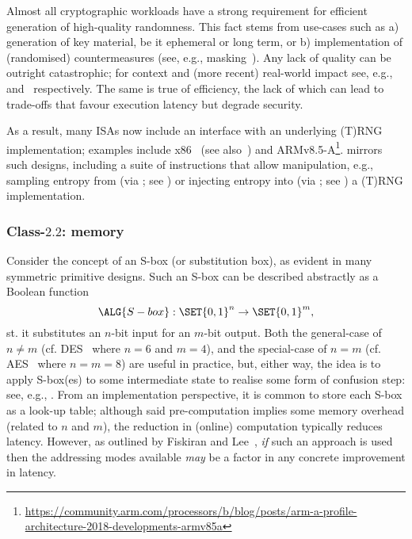 Almost all cryptographic workloads have a strong requirement for efficient
generation of high-quality randomness.  This fact stems from use-cases such
as
a) generation of key material, be it ephemeral or long term,
   or
b) implementation of (randomised) countermeasures
   (see, e.g., masking~\cite[Chapter 9]{SCARV:ManOswPop:07}).
Any lack of quality can be outright catastrophic;
for context and (more recent) real-world impact see, e.g.,~\cite{SCARV:KSWH:98,SCARV:RFC:4086} and~\cite{SCARV:NSSKM:17} respectively.
The same is true of efficiency, the lack of which can lead to trade-offs 
that favour execution latency but degrade security.

As a result, many ISAs now include an interface with an underlying (T)RNG
implementation; examples include
x86~\cite[Section 7.3.17.1 and 7.3.17.2]{SCARV:X86:2:18} (see also~\cite{SCARV:JunKoc:99,SCARV:HamKocMar:12})
and
ARMv8.5-A\footnote{
\url{https://community.arm.com/processors/b/blog/posts/arm-a-profile-architecture-2018-developments-armv85a}
}.  \XCRYPTO mirrors such designs, including
a suite of instructions 
that allow 
manipulation, e.g.,
 sampling entropy from (via ; see )
or
injecting entropy into (via ; see )
a (T)RNG implementation.


\subsubsection{Class-$2.2$: memory}
\label{sec:bg:feature:2:2}

Consider the concept of an S-box (or substitution box), as evident in many 
symmetric primitive designs.  Such an S-box can be described abstractly as 
a Boolean function
\[
\ALG{S-box} : \SET{ 0, 1 }^{n} \rightarrow \SET{ 0, 1 }^{m} ,
\]
st. it substitutes an $n$-bit input for an $m$-bit output.  Both 
the general-case of $n \neq m$
(cf. DES~\cite{SCARV:FIPS:46_3} where $n = 6$ and $m = 4$),
and 
the special-case of $n =    m$
(cf. AES~\cite{SCARV:FIPS:197}  where $n = m = 8$)
are useful in practice, but, either way, the idea is to apply S-box(es) to
some intermediate state to realise some form of confusion step: see, e.g., 
\cite[Section 1.3]{SCARV:KnuRob:11}.
From an implementation perspective, it is common to store each S-box as a
look-up table; although said pre-computation implies some memory overhead
(related to $n$ and $m$), the reduction in (online) computation typically
reduces latency.
However, as outlined by Fiskiran and Lee~\cite{SCARV:FisLee:01}, {\em if}
such an approach is used then the addressing modes available {\em may} be
a factor in any concrete improvement in latency.

